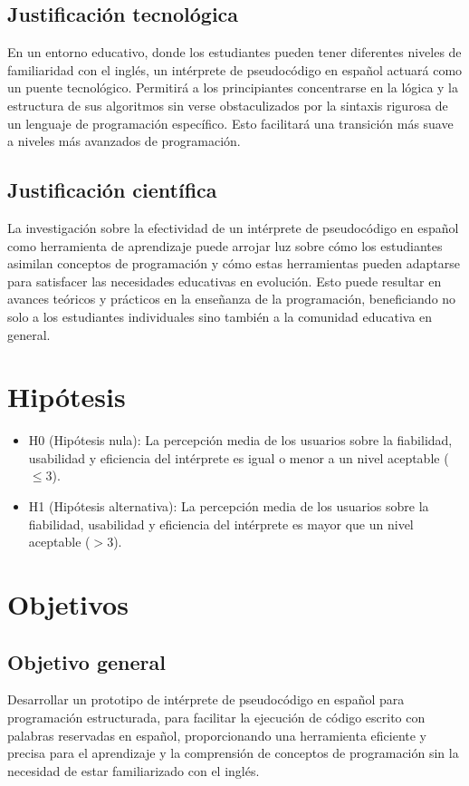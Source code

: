 \subsection{Justificación tecnológica}
En un entorno educativo, donde los estudiantes pueden tener diferentes niveles de familiaridad con el inglés, un intérprete de pseudocódigo en español  actuará como un puente tecnológico. Permitirá a los principiantes concentrarse en la lógica y la estructura de sus algoritmos sin verse obstaculizados por la sintaxis rigurosa de un lenguaje de programación específico. Esto facilitará una transición más suave a niveles más avanzados de programación.

\subsection{Justificación científica}
La investigación sobre la efectividad de un intérprete de pseudocódigo en español como herramienta de aprendizaje puede arrojar luz sobre cómo los estudiantes asimilan conceptos de programación y cómo estas herramientas pueden adaptarse para satisfacer las necesidades educativas en evolución. Esto puede resultar en avances teóricos y prácticos en la enseñanza de la programación, beneficiando no solo a los estudiantes individuales sino también a la comunidad educativa en general.

\section{Hipótesis}
\begin{itemize}
  \item H0 (Hipótesis nula): La percepción media de los usuarios sobre la fiabilidad, usabilidad y eficiencia del intérprete es igual o menor a un nivel aceptable ($\leq3$).
  \item  H1 (Hipótesis alternativa): La percepción media de los usuarios sobre la fiabilidad, usabilidad y eficiencia del intérprete es mayor que un nivel aceptable ($>3$).
\end{itemize}

\section{Objetivos}
\subsection{Objetivo general}
Desarrollar un prototipo de intérprete de pseudocódigo en español para programación estructurada, para facilitar la ejecución de código escrito con palabras reservadas en español, proporcionando una herramienta eficiente y precisa para el aprendizaje y la comprensión de conceptos de programación sin la necesidad de estar familiarizado con el inglés.

